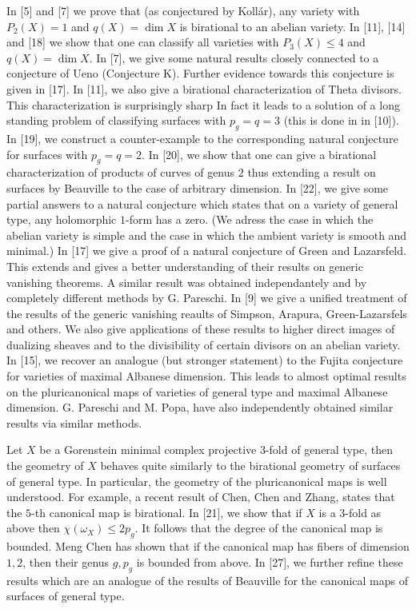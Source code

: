 \documentclass[12pt] {amsart}
\begin{document}
In [5] and [7] we prove that (as conjectured by Koll\'ar), any variety with
$P_2(X)=1$ and $q(X)=\dim X$ is birational to an abelian variety.
In [11], [14] and [18] we show that one can classify all varieties with
$P_3(X)\leq 4$ and $q(X)=\dim X$.
In [7], we give some natural results closely connected to a conjecture of Ueno (Conjecture K). Further evidence towards this conjecture is given in [17].
In [11], we also give a birational characterization of Theta divisors. This
characterization is surprisingly sharp In fact it leads to a solution of a 
long standing problem of classifying surfaces with $p_g=q=3$ (this is done in in [10]).
In [19], we construct a counter-example to the corresponding natural conjecture for surfaces with $p_g=q=2$.
In [20], we show that one can give a birational characterization of
products of curves of genus $2$ thus extending a result on surfaces by Beauville to the case of arbitrary dimension.
In [22], we give some partial answers to a natural conjecture which states that on a variety of general type, any holomorphic $1$-form has a zero. (We adress the case in which the abelian variety is simple and the case in which the ambient variety is smooth and minimal.)
In [17] we give a proof of a natural conjecture of Green and Lazarsfeld. This extends and gives a better understanding of their results on generic vanishing theorems. A similar result was obtained independantely and by completely different methods by G. Pareschi.
In [9] we give a unified treatment of the results of the generic vanishing reaults of Simpson, Arapura, Green-Lazarsfels and others. We also give applications of these results to higher direct images of dualizing sheaves and to the divisibility of certain divisors on an abelian variety.
In [15], we recover an analogue (but stronger statement) to the Fujita conjecture for varieties of maximal Albanese dimension. This leads to almost optimal results on the pluricanonical maps of varieties of general type and maximal Albanese dimension. G. Pareschi and M. Popa, have also independently obtained similar results via similar methods.

\bigskip
{}
Let $X$ be a Gorenstein minimal complex projective 3-fold of general type, then the geometry of $X$ behaves quite similarly to the birational geometry of surfaces of general type. In particular, the geometry of the pluricanonical maps
is well understood. For example, a recent result of Chen, Chen and Zhang, states that the $5$-th canonical map is birational. In [21], we show that if $X$
is a $3$-fold as above then $\chi (\omega _X)\leq 2p_g$. It follows that
the degree of the canonical map is bounded. Meng Chen has shown that if
the canonical map has fibers of dimension $1,2$, then their genus $g,p_g$ is
bounded from above. In [27], we further refine these results which are an analogue of the results of Beauville for the canonical maps of surfaces of general type.
\end{document}
